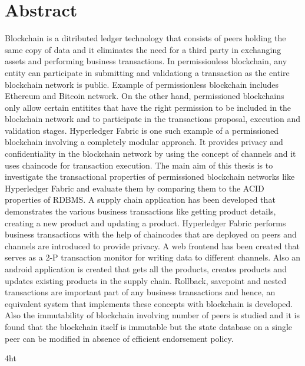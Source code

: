 \documentclass[
  a4paper,  %
  twoside,  %
  bibliography=totoc,
  headsepline,
  cleardoublepage=empty,
  parskip=half,
  draft=false
]{scrbook}
\begin{document}
  \section*{Abstract}
\fi
Blockchain is a ditributed ledger technology that consists of peers holding the same copy of data and it eliminates the need for a third party in exchanging assets and performing business transactions. In permissionless blockchain, any entity can participate in submitting and validationg a transaction as the entire blockchain network is public. Example of permissionless blockchain includes Ethereum and Bitcoin network. On the other hand, permissioned blockchains only allow certain entitites that have the right permission to be included in the blockchain network and to participate in the transactions proposal, execution and validation stages. Hyperledger Fabric is one such example of a permissioned blockchain involving a completely modular approach. It provides privacy and confidentiality in the blockchain network by using the concept of channels and it uses chaincode for transaction execution. \linebreak \linebreak
The main aim of this thesis is to investigate the transactional properties of permissioned blockchain networks like
Hyperledger Fabric and evaluate them by comparing them to the ACID properties of RDBMS. A supply chain application has been developed that demonstrates the various business transactions like getting product details, creating a new product and updating a product. Hyperledger Fabric performs business transactions with the help of chaincodes that are deployed on peers and channels are introduced to provide privacy. A web frontend has been created that serves as a 2-P transaction monitor for writing data to different channels. Also an android application is created that gets all the products, creates products and updates existing products in the supply chain. Rollback, savepoint and nested transactions are important part of any business transactions and hence, an equivalent system that implements these concepts with blockchain is developed. Also the immutability of blockchain involving number of peers is studied and it is found that the blockchain itself is immutable but the state database on a single peer can be modified in absence of efficient endorsement policy. 

\cleardoublepage



\iftex4ht
\else
\fi
\end{document}
